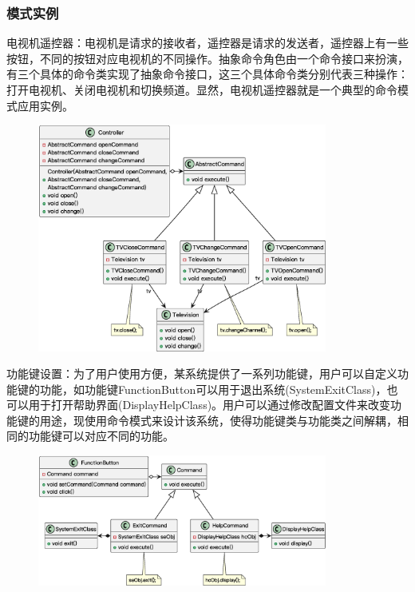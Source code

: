 \subsubsection{模式实例}
电视机遥控器：电视机是请求的接收者，遥控器是请求的发送者，遥控器上有一些按钮，不同的按钮对应电视机的不同操作。抽象命令角色由一个命令接口来扮演，有三个具体的命令类实现了抽象命令接口，这三个具体命令类分别代表三种操作：打开电视机、关闭电视机和切换频道。显然，电视机遥控器就是一个典型的命令模式应用实例。
\begin{figure}[H]
    \vspace{-0.5em}
	\centering
	\includegraphics[width=0.85\textwidth]{images/命令模式实例1.eps}
    \vspace{-1em}
\end{figure}

功能键设置：为了用户使用方便，某系统提供了一系列功能键，用户可以自定义功能键的功能，如功能键FunctionButton可以用于退出系统(SystemExitClass)，也可以用于打开帮助界面(DisplayHelpClass)。用户可以通过修改配置文件来改变功能键的用途，现使用命令模式来设计该系统，使得功能键类与功能类之间解耦，相同的功能键可以对应不同的功能。
\begin{figure}[H]
    \vspace{-0.5em}
	\centering
	\includegraphics[width=0.85\textwidth]{images/命令模式实例2.eps}
    \vspace{-1em}
\end{figure}

